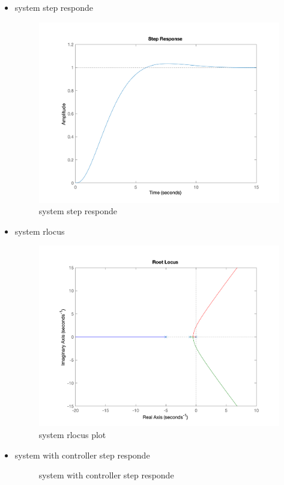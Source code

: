 \begin{itemize}
    \item system step responde
    \begin{figure}[H]
        \caption{system step responde}
        \centering
        \includegraphics[width=12cm]{../Figure/Q4/Q4_system_respond.png}
    \end{figure}
    \item system rlocus
    \begin{figure}[H]
        \caption{system rlocus plot}
        \centering
        \includegraphics[width=12cm]{../Figure/Q4/Q4_system_rlocus.png}
    \end{figure}
    \item system with controller step responde
    \begin{figure}[H]
        \caption{system with controller step responde}
        \centering

\end{figure}
\end{itemize}
